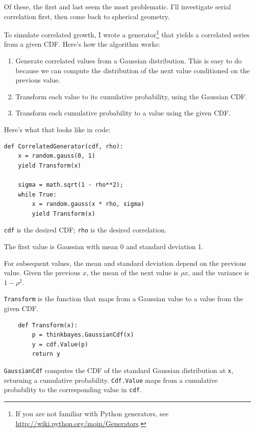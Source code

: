 \documentclass[12pt]{book}
\begin{document}
Of these, the first and last seem the most problematic.  I'll
investigate serial correlation first, then come back to
spherical geometry.

To simulate correlated growth, I wrote a generator\footnote{If you are
  not familiar with Python generators, see
  \url{http://wiki.python.org/moin/Generators}.} that yields a
correlated series from a given CDF.  Here's how the algorithm works:

\begin{enumerate}

\item Generate correlated values from a Gaussian distribution.
  This is easy to do because we can compute the distribution
  of the next value conditioned on the previous value.

\item Transform each value to its cumulative probability, using
  the Gaussian CDF.

\item Transform each cumulative probability to a value
  using the given CDF.

\end{enumerate}

Here's what that looks like in code:

\begin{verbatim}
def CorrelatedGenerator(cdf, rho):
    x = random.gauss(0, 1)
    yield Transform(x)

    sigma = math.sqrt(1 - rho**2);    
    while True:
        x = random.gauss(x * rho, sigma)
        yield Transform(x)
\end{verbatim}

{\tt cdf} is the desired CDF; {\tt rho} is the desired correlation.

The first value is Gaussian with mean 0 and standard deviation 1.

For subsequent values, the mean and standard deviation depend on the
previous value.  Given the previous $x$, the mean of the next value is
$\rho x$, and the variance is $1 - \rho^2$.

{\tt Transform} is the function that maps from
a Gaussian value to a value from the given CDF.

\begin{verbatim}
    def Transform(x):
        p = thinkbayes.GaussianCdf(x)
        y = cdf.Value(p)
        return y
\end{verbatim}

{\tt GaussianCdf} computes the CDF of the standard Gaussian
distribution at {\tt x}, returning a cumulative probability.
{\tt Cdf.Value} maps from a cumulative probability to the
corresponding value in {\tt cdf}.
\end{document}
